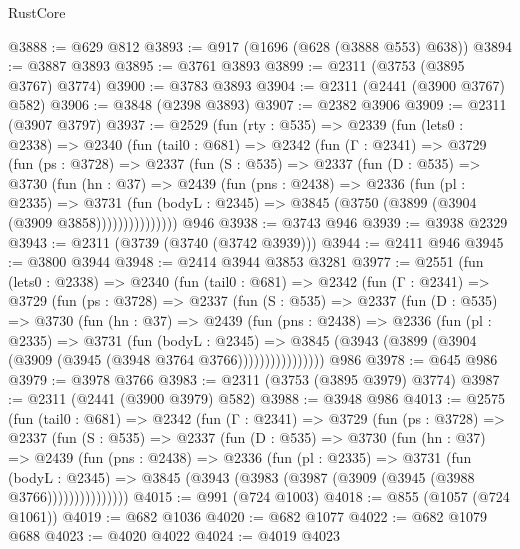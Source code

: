 \begin{lexlean}{RustCore}
\begin{coremodule}
@3888 := @629 @812
@3893 := @917 (@1696 (@628 (@3888 @553) @638))
@3894 := @3887 @3893
@3895 := @3761 @3893
@3899 := @2311 (@3753 (@3895 @3767) @3774)
@3900 := @3783 @3893
@3904 := @2311 (@2441 (@3900 @3767) @582)
@3906 := @3848 (@2398 @3893)
@3907 := @2382 @3906
@3909 := @2311 (@3907 @3797)
@3937 := @2529
    (fun (rty : @535) =>
    @2339
      (fun (lets0 : @2338) =>
      @2340
        (fun (tail0 : @681) =>
        @2342
          (fun (Γ : @2341) =>
          @3729
            (fun (ps : @3728) =>
            @2337
              (fun (S : @535) =>
              @2337
                (fun (D : @535) =>
                @3730
                  (fun (hn : @37) =>
                  @2439
                    (fun (pns : @2438) =>
                    @2336
                      (fun (pl : @2335) =>
                      @3731
                        (fun (bodyL : @2345) =>
                        @3845 (@3750 (@3899 (@3904 (@3909 @3858)))))))))))))))
    @946
@3938 := @3743 @946
@3939 := @3938 @2329
@3943 := @2311 (@3739 (@3740 (@3742 @3939)))
@3944 := @2411 @946
@3945 := @3800 @3944
@3948 := @2414 @3944 @3853 @3281
@3977 := @2551
    (fun (lets0 : @2338) =>
    @2340
      (fun (tail0 : @681) =>
      @2342
        (fun (Γ : @2341) =>
        @3729
          (fun (ps : @3728) =>
          @2337
            (fun (S : @535) =>
            @2337
              (fun (D : @535) =>
              @3730
                (fun (hn : @37) =>
                @2439
                  (fun (pns : @2438) =>
                  @2336
                    (fun (pl : @2335) =>
                    @3731
                      (fun (bodyL : @2345) =>
                      @3845 (@3943 (@3899 (@3904 (@3909 (@3945 (@3948 @3764 @3766))))))))))))))))
    @986
@3978 := @645 @986
@3979 := @3978 @3766
@3983 := @2311 (@3753 (@3895 @3979) @3774)
@3987 := @2311 (@2441 (@3900 @3979) @582)
@3988 := @3948 @986
@4013 := @2575
    (fun (tail0 : @681) =>
    @2342
      (fun (Γ : @2341) =>
      @3729
        (fun (ps : @3728) =>
        @2337
          (fun (S : @535) =>
          @2337
            (fun (D : @535) =>
            @3730
              (fun (hn : @37) =>
              @2439
                (fun (pns : @2438) =>
                @2336
                  (fun (pl : @2335) =>
                  @3731
                    (fun (bodyL : @2345) =>
                    @3845 (@3943 (@3983 (@3987 (@3909 (@3945 (@3988 @3766)))))))))))))))
@4015 := @991 (@724 @1003)
@4018 := @855 (@1057 (@724 @1061))
@4019 := @682 @1036
@4020 := @682 @1077
@4022 := @682 @1079 @688
@4023 := @4020 @4022
@4024 := @4019 @4023

\end{coremodule}
\end{lexlean}
